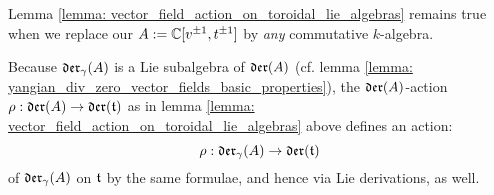         \begin{remark}
            Lemma \ref{lemma: vector_field_action_on_toroidal_lie_algebras} remains true when we replace our $A := \mathbb{C}[v^{\pm 1}, t^{\pm 1}]$ by \textit{any} commutative $k$-algebra.
        \end{remark}
        \begin{corollary} \label{coro: a_fixed_yangian_div_zero_vector_field_action} 
            Because $\mathfrak{der}_{\gamma}(A)$ is a Lie subalgebra of $\mathfrak{der}(A)$ (cf. lemma \ref{lemma: yangian_div_zero_vector_fields_basic_properties}), the $\mathfrak{der}(A)$-action $\rho: \mathfrak{der}(A) \to \mathfrak{der}(\mathfrak{t})$ as in lemma \ref{lemma: vector_field_action_on_toroidal_lie_algebras} above defines an action:
                $$\rho: \mathfrak{der}_{\gamma}(A) \to \mathfrak{der}(\mathfrak{t})$$
            of $\mathfrak{der}_{\gamma}(A)$ on $\mathfrak{t}$ by the same formulae, and hence via Lie derivations, as well.
        \end{corollary}
            
